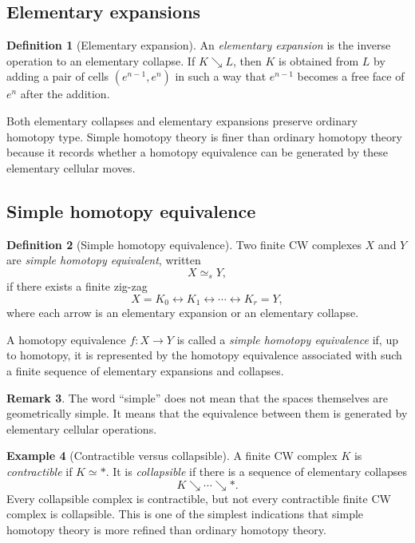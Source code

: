 \documentclass[11pt,a4paper]{article}
\theoremstyle{definition}
\newtheorem{definition}{Definition}[section]
\newtheorem{example}[definition]{Example}
\newtheorem{remark}[definition]{Remark}
\theoremstyle{plain}
\theoremstyle{remark}
\begin{document}
\subsection{Elementary expansions}

\begin{definition}[Elementary expansion]
An \emph{elementary expansion} is the inverse operation to an elementary collapse. If \(K\searrow L\), then \(K\) is obtained from \(L\) by adding a pair of cells \((e^{n-1},e^n)\) in such a way that \(e^{n-1}\) becomes a free face of \(e^n\) after the addition.
\end{definition}

Both elementary collapses and elementary expansions preserve ordinary homotopy type. Simple homotopy theory is finer than ordinary homotopy theory because it records whether a homotopy equivalence can be generated by these elementary cellular moves.

\subsection{Simple homotopy equivalence}

\begin{definition}[Simple homotopy equivalence]
Two finite CW complexes \(X\) and \(Y\) are \emph{simple homotopy equivalent}, written
\[
  X\simeq_s Y,
\]
if there exists a finite zig-zag
\[
  X=K_0\longleftrightarrow K_1\longleftrightarrow\cdots\longleftrightarrow K_r=Y,
\]
where each arrow is an elementary expansion or an elementary collapse.

A homotopy equivalence \(f:X\to Y\) is called a \emph{simple homotopy equivalence} if, up to homotopy, it is represented by the homotopy equivalence associated with such a finite sequence of elementary expansions and collapses.
\end{definition}

\begin{remark}
The word ``simple'' does not mean that the spaces themselves are geometrically simple. It means that the equivalence between them is generated by elementary cellular operations.
\end{remark}

\begin{example}[Contractible versus collapsible]
A finite CW complex \(K\) is \emph{contractible} if \(K\simeq *\). It is \emph{collapsible} if there is a sequence of elementary collapses
\[
  K\searrow \cdots\searrow *.
\]
Every collapsible complex is contractible, but not every contractible finite CW complex is collapsible. This is one of the simplest indications that simple homotopy theory is more refined than ordinary homotopy theory.
\end{example}
\end{document}
